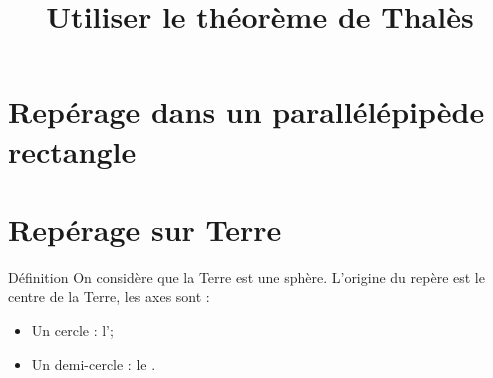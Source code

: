 \documentclass[xcolor={dvipsnames}]{beamer}
\title{Utiliser le théorème de Thalès}
\author{}\institute{}
\begin{document}
\begin{frame}
  \titlepage 
\end{frame}

\section{Repérage dans un parallélépipède rectangle}





\section{Repérage sur Terre}

\begin{frame}
	\begin{alertblock}{Définition}
		On considère que la Terre est une sphère. L'origine du repère est le centre de la Terre, les axes sont :
		\begin{itemize}
			\item Un cercle : l';
			\item Un demi-cercle : le .
		\end{itemize}
		
		
	\end{alertblock}
\end{frame}
\end{document}
